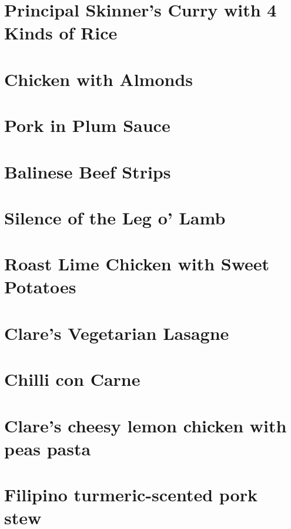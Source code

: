   \section{Principal Skinner's Curry with 4 Kinds of Rice}
  \section{Chicken with Almonds}
  \section{Pork in Plum Sauce}
  \section{Balinese Beef Strips}
  \section{Silence of the Leg o' Lamb}
  \section{Roast Lime Chicken with Sweet Potatoes}
  \section{Clare's Vegetarian Lasagne}
  \section{Chilli con Carne}
  \section{Clare's cheesy lemon chicken with peas pasta}
  \section{Filipino turmeric-scented pork stew}
  \clearpage
